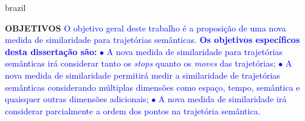 {\begin{otherlanguage*}{brazil}
\begin{resumo}
        \newline
        \newline
        \textbf{OBJETIVOS}
        \newline
        \newline
        \textcolor{blue}{
        O objetivo geral deste trabalho é a proposição de uma nova medida de similaridade para trajetórias semânticas.
        \newline
        \textbf{Os objetivos específicos desta dissertação são:}
        \newline
        $\bullet$ A nova medida de similaridade para trajetórias semânticas irá considerar tanto os \emph{stops} quanto os \emph{moves} das trajetórias;
        \newline
        $\bullet$ A nova medida de similaridade permitirá medir a similaridade de trajetórias semânticas considerando múltiplas dimensões como espaço, tempo, semântica e quaisquer outras dimensões adicionais;
        \newline
        $\bullet$ A nova medida de similaridade irá considerar parcialmente a ordem dos pontos na trajetória semântica.
        }
        \newline
        \newline
        

\end{resumo}
\end{otherlanguage*}}
